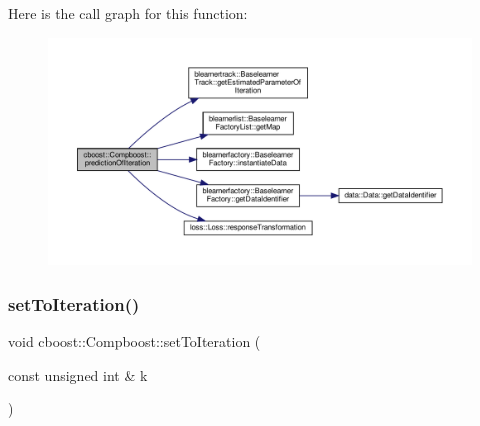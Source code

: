 Here is the call graph for this function\+:\nopagebreak
\begin{figure}[H]
\begin{center}
\leavevmode
\includegraphics[width=350pt]{classcboost_1_1_compboost_abd00401a8914cde27a93673e12ab3468_cgraph}
\end{center}
\end{figure}
\mbox{\label{classcboost_1_1_compboost_ad1ee3b88f585f38255d827dceb4b7659}} 
\subsubsection{\texorpdfstring{set\+To\+Iteration()}{setToIteration()}}
{\footnotesize\ttfamily void cboost\+::\+Compboost\+::set\+To\+Iteration (\begin{DoxyParamCaption}\item[{const unsigned int \&}]{k }\end{DoxyParamCaption})}

